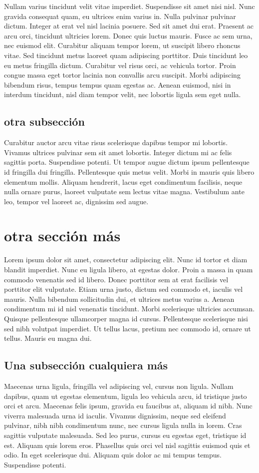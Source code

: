 \documentclass[a4paper,10pt]{article}
\begin{document}
Nullam varius tincidunt velit vitae imperdiet. Suspendisse sit amet nisi nisl. Nunc gravida consequat quam, eu ultrices enim varius in. 
Nulla 
pulvinar pulvinar dictum. Integer at erat vel nisl lacinia posuere. Sed sit amet dui erat. Praesent ac arcu orci, tincidunt ultricies 
lorem. 
Donec quis luctus mauris. Fusce ac sem urna, nec euismod elit. Curabitur aliquam tempor lorem, ut suscipit libero rhoncus vitae. Sed 
tincidunt metus laoreet quam adipiscing porttitor. Duis tincidunt leo eu metus fringilla dictum. Curabitur vel risus orci, ac vehicula 
tortor. Proin congue massa eget tortor lacinia non convallis arcu suscipit. Morbi adipiscing bibendum risus, tempus tempus quam egestas 
ac. 
Aenean euismod, nisi in interdum tincidunt, nisl diam tempor velit, nec lobortis ligula sem eget nulla.

\subsection{otra subsección}
Curabitur auctor arcu vitae risus scelerisque dapibus tempor mi lobortis. Vivamus ultrices pulvinar sem sit amet lobortis. Integer dictum 
mi 
ac felis sagittis porta. Suspendisse potenti. Ut tempor augue dictum ipsum pellentesque id fringilla dui fringilla. Pellentesque quis 
metus 
velit. Morbi in mauris quis libero elementum mollis. Aliquam hendrerit, lacus eget condimentum facilisis, neque nulla ornare purus, 
laoreet 
vulputate sem lectus vitae magna. Vestibulum ante leo, tempor vel laoreet ac, dignissim sed augue.


\section{otra sección más}
Lorem ipsum dolor sit amet, consectetur adipiscing elit. Nunc id tortor et diam blandit imperdiet. Nunc eu ligula libero, at egestas 
dolor. 
Proin a massa in quam commodo venenatis sed id libero. Donec porttitor sem at erat facilisis vel porttitor elit vulputate. Etiam urna 
justo, 
dictum sed commodo et, iaculis vel mauris. Nulla bibendum sollicitudin dui, et ultrices metus varius a. Aenean condimentum mi id nisl 
venenatis tincidunt. Morbi scelerisque ultricies accumsan. Quisque pellentesque ullamcorper magna id cursus. Pellentesque scelerisque nisi 
sed nibh volutpat imperdiet. Ut tellus lacus, pretium nec commodo id, ornare ut tellus. Mauris eu magna dui.

\subsection{Una subsección cualquiera más}
Maecenas urna ligula, fringilla vel adipiscing vel, cursus non ligula. Nullam dapibus, quam ut egestas elementum, ligula leo vehicula 
arcu, 
id tristique justo orci et arcu. Maecenas felis ipsum, gravida eu faucibus at, aliquam id nibh. Nunc viverra malesuada urna id iaculis. 
Vivamus dignissim, neque sed eleifend pulvinar, nibh nibh condimentum nunc, nec cursus ligula nulla in lorem. Cras sagittis vulputate 
malesuada. Sed leo purus, cursus eu egestas eget, tristique id est. Aliquam quis lorem eros. Phasellus quis orci vel nisl sagittis euismod 
quis et odio. In eget scelerisque dui. Aliquam quis dolor ac mi tempus tempus. Suspendisse potenti.
\end{document}
